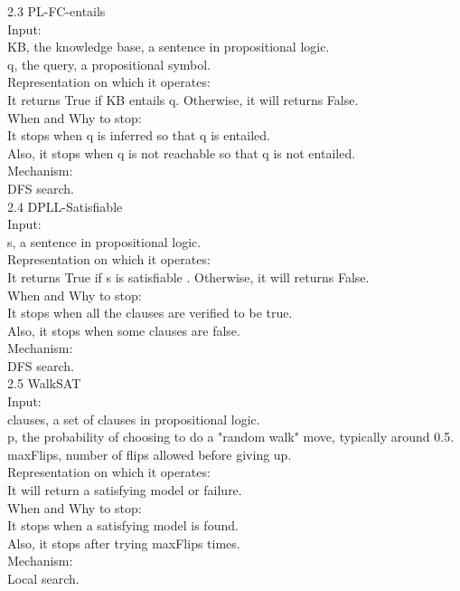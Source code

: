 \documentclass[a4paper]{article}
\begin{document}
2.3 PL-FC-entails \\
Input:\\
KB, the knowledge base, a sentence in propositional logic.\\
q, the query, a propositional symbol.\\
Representation on which it operates:\\
It returns True if KB entails q. Otherwise, it will returns False.\\
When and Why to stop:\\
It stops when q is inferred so that q is entailed.\\
Also, it stops when q is not reachable so that q is not entailed.\\
Mechanism:\\
DFS search.\\

2.4 DPLL-Satisfiable \\
Input:\\
s, a sentence in propositional logic.\\
Representation on which it operates:\\
It returns True if s is satisfiable . Otherwise, it will returns False.\\
When and Why to stop:\\
It stops when all the clauses are verified to be true.\\
Also, it stops when some clauses are false.\\
Mechanism:\\
DFS search.\\

2.5 WalkSAT \\
Input:\\
clauses, a set of clauses in propositional logic.\\
p, the probability of choosing to do a "random walk" move, typically around 0.5.\\
maxFlips, number of flips allowed before giving up.\\
Representation on which it operates:\\
It will return a satisfying model or failure.\\
When and Why to stop:\\
It stops when a satisfying model is found.\\
Also, it stops after trying maxFlips times.\\
Mechanism:\\
Local search.\\
\end{document}
